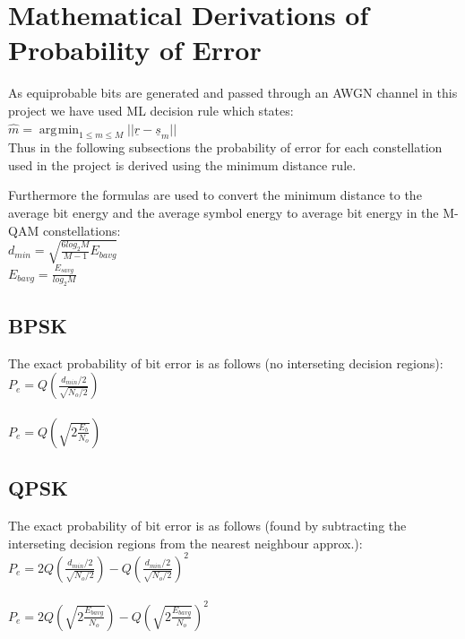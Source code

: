 \documentclass[]{article}
\DeclareMathOperator*{\argmin}{\arg\!\min}
\begin{document}
\newpage
\section{Mathematical Derivations of Probability of Error}
\label{sec:deriv}
As equiprobable bits are generated and passed through an AWGN channel in this project we have used ML decision rule which states: \\

$\hat{m} = \argmin_{1\leq m \leq M}{||\underline{r} - \underline{s}_m||}$ 
\\

Thus in the following subsections the probability of error for each constellation used in the project is derived using the minimum distance rule.

Furthermore the formulas are used to convert the minimum distance to the average bit energy and the average symbol energy to average bit energy in the M-QAM constellations:\\

$d_{min} = \sqrt{\frac{6log_2M}{M-1}E_{bavg}} $\\

$E_{bavg} = \frac{E_{savg}}{log_2M}$



\subsection{BPSK}
\label{sec:bpsk}
The exact probability of bit error is as follows (no interseting decision regions):\\

$ P_e = Q(\frac{d_{min}/2}{\sqrt{N_o/2}}) $ \\
\\
$ P_e = Q(\sqrt{2\frac{E_b}{N_o}}) $ \\

\subsection{QPSK}
\label{sec:qpsk}

The exact probability of bit error is as follows (found by subtracting the interseting decision regions from the nearest neighbour approx.):\\

$ P_e = 2Q(\frac{d_{min}/2}{\sqrt{N_o/2}})-Q(\frac{d_{min}/2}{\sqrt{N_o/2}})^2$ \\
\\
$ P_e = 2Q(\sqrt{2\frac{E_{bavg}}{N_o}})-Q(\sqrt{2\frac{E_{bavg}}{N_o}})^2$ \\
\end{document}
